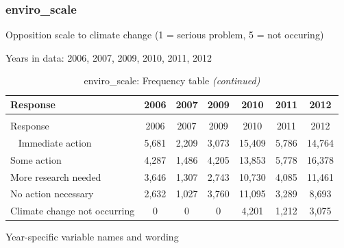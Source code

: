 \documentclass[12pt]{article}
\begin{document}
\subsubsection{enviro\_scale}\label{enviro_scale}

Opposition scale to climate change (1 = serious problem, 5 = not
occuring)

Years in data: 2006, 2007, 2009, 2010, 2011,
2012\begingroup\fontsize{10}{12}\selectfont

\begin{longtable}[t]{lcccccc}
\caption{\label{tab:unnamed-chunk-4}enviro\_scale: Frequency table}\\
\toprule
Response & 2006 & 2007 & 2009 & 2010 & 2011 & 2012\\
\midrule
\endfirsthead
\caption[]{enviro\_scale: Frequency table \textit{(continued)}}\\
\toprule
Response & 2006 & 2007 & 2009 & 2010 & 2011 & 2012\\
\midrule
\endhead
\
\endfoot
\bottomrule
\endlastfoot
Immediate action & 5,681 & 2,209 & 3,073 & 15,409 & 5,786 & 14,764\\
Some action & 4,287 & 1,486 & 4,205 & 13,853 & 5,778 & 16,378\\
More research needed & 3,646 & 1,307 & 2,743 & 10,730 & 4,085 & 11,461\\
No action necessary & 2,632 & 1,027 & 3,760 & 11,095 & 3,289 & 8,693\\
Climate change not occurring & 0 & 0 & 0 & 4,201 & 1,212 & 3,075\\*
\end{longtable}

\endgroup{}

Year-specific variable names and wording
\end{document}
